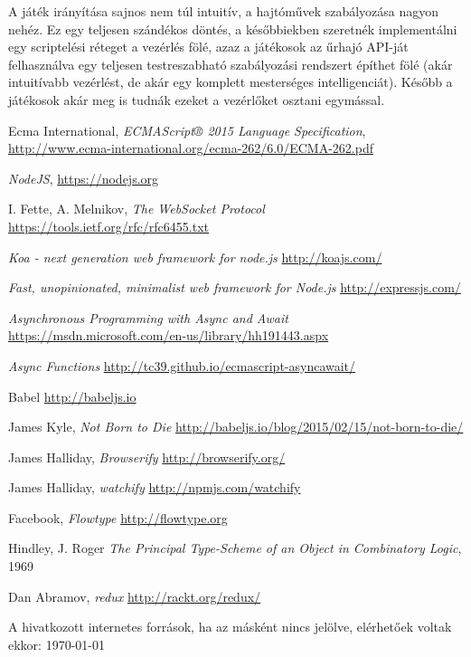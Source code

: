 \documentclass[11pt]{article}
\begin{document}
A játék irányítása sajnos nem túl intuitív, a hajtóművek szabályozása nagyon
nehéz. Ez egy teljesen szándékos döntés, a későbbiekben szeretnék implementálni
egy scriptelési réteget a vezérlés fölé, azaz a játékosok az űrhajó API-ját
felhasználva egy teljesen testreszabható szabályozási rendszert építhet fölé
(akár intuitívabb vezérlést, de akár egy komplett mesterséges intelligenciát).
Később a játékosok akár meg is tudnák ezeket a vezérlőket osztani egymással.

\begin{thebibliography}{9}
  Ecma International, \emph{ECMAScript® 2015 Language Specification},
  \url{http://www.ecma-international.org/ecma-262/6.0/ECMA-262.pdf}

  \emph{NodeJS}, \url{https://nodejs.org}

  I. Fette, A. Melnikov,
  \emph{The WebSocket Protocol}
  \url{https://tools.ietf.org/rfc/rfc6455.txt}

  \emph{Koa - next generation web framework for node.js}
  \url{http://koajs.com/}

  \emph{Fast, unopinionated, minimalist web framework for Node.js}
  \url{http://expressjs.com/}

  \emph{Asynchronous Programming with Async and Await}
  \url{https://msdn.microsoft.com/en-us/library/hh191443.aspx}

  \emph{Async Functions}
  \url{http://tc39.github.io/ecmascript-asyncawait/}

  Babel
  \url{http://babeljs.io}

  James Kyle, \emph{Not Born to Die}
  \url{http://babeljs.io/blog/2015/02/15/not-born-to-die/}

  James Halliday, \emph{Browserify} \url{http://browserify.org/}

  James Halliday, \emph{watchify} \url{http://npmjs.com/watchify}

  Facebook, \emph{Flowtype} \url{http://flowtype.org}

  Hindley, J. Roger \emph{The Principal Type-Scheme of an Object in Combinatory Logic}, 1969

  Dan Abramov, \emph{redux} \url{http://rackt.org/redux/}

\end{thebibliography}

A hivatkozott internetes források, ha az másként nincs jelölve, elérhetőek voltak ekkor: \today
\end{document}
